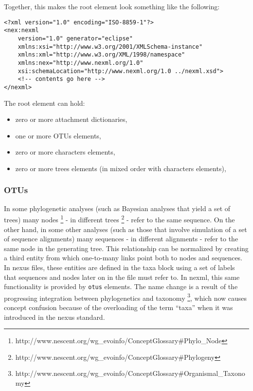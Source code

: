 \documentclass{article}
\newcommand{\code}{\texttt} \usepackage{fullpage}
\begin{document}
Together, this makes the root element look something like the following:
\begin{verbatim} 
<?xml version="1.0" encoding="ISO-8859-1"?> 
<nex:nexml
    version="1.0" generator="eclipse"
    xmlns:xsi="http://www.w3.org/2001/XMLSchema-instance"
    xmlns:xml="http://www.w3.org/XML/1998/namespace"
    xmlns:nex="http://www.nexml.org/1.0"
    xsi:schemaLocation="http://www.nexml.org/1.0 ../nexml.xsd"> 
    <!-- contents go here --> 
</nexml> 
\end{verbatim} 
The root element can hold:

\begin{itemize}

\item zero or more attachment dictionaries,

\item one or more OTUs elements,

\item zero or more characters elements,

\item zero or more trees elements (in mixed order with characters
elements),

\end{itemize}

\subsubsection{OTUs} 

In some phylogenetic analyses (such as Bayesian analyses that yield a
set of trees) many nodes
\footnote{http://www.nescent.org/wg\_evoinfo/ConceptGlossary\#Phylo\_Node} 
- in different trees
\footnote{http://www.nescent.org/wg\_evoinfo/ConceptGlossary\#Phylogeny}
- refer to the same sequence. On the other hand, in some other analyses
(such as those that involve simulation of a set of sequence alignments)
many sequences - in different alignments - refer to the same node in the
generating tree. This relationship can be normalized by creating a third
entity from which one-to-many links point both to nodes and sequences.
In nexus files, these entities are defined in the taxa block using a set
of labels that sequences and nodes later on in the file must refer to.
In nexml, this same functionality is provided by \code{otus} elements.
The name change is a result of the progressing integration between
phylogenetics and taxonomy
\footnote{http://www.nescent.org/wg\_evoinfo/ConceptGlossary\#Organismal\_Taxonomy}, 
which now causes concept confusion because of the
overloading of the term ``taxa'' when it was introduced in the nexus
standard.
\end{document}

